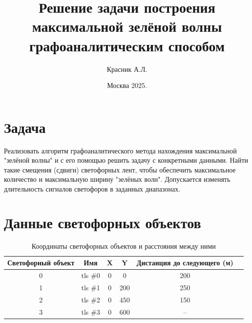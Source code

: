 \documentclass[12pt]{article}
\title{Решение задачи построения максимальной зелёной волны графоаналитическим способом}
\author{Красник А.Л.}
\date{Москва 2025.}
\begin{document}
\maketitle
\newpage
\section{Задача}
Реализовать алгоритм графоаналитического метода нахождения максимальной "зелёной волны" и с его помощью решить задачу с конкретными данными. Найти такие смещения (сдвиги) светофорных лент, чтобы обеспечить максимальное количество и максимальную ширину "зелёных волн". Допускается изменять длительность сигналов светофоров в заданных диапазонах.
\section{Данные светофорных объектов}
\begin{table}[h!]
\centering
\caption{Координаты светофорных объектов и расстояния между ними}
\begin{tabular}{cccccc}
\toprule
Светофорный объект & Имя & X & Y & Дистанция до следующего (м) \\
\midrule
0 & tls \#0 & 0   & 0   & 200 \\
1 & tls \#1 & 0   & 200 & 250 \\
2 & tls \#2 & 0   & 450 & 150 \\
3 & tls \#3 & 0   & 600 & --  \\
\bottomrule
\end{tabular}
\end{table}
\end{document}

